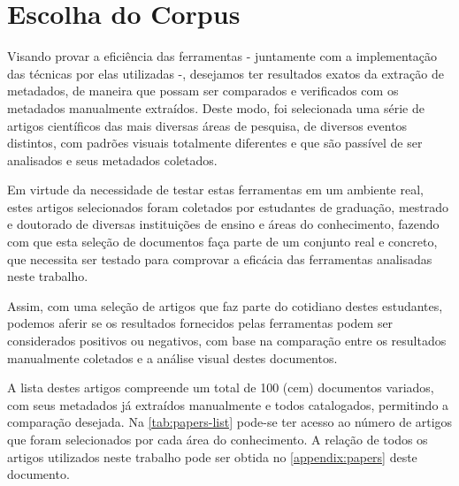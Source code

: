 \section{Escolha do Corpus}
\label{sec:corpus}


Visando provar a eficiência das ferramentas - juntamente com a implementação das técnicas por elas utilizadas -, desejamos ter resultados exatos da extração de metadados, de maneira que possam ser comparados e verificados com os metadados manualmente extraídos. Deste modo, foi selecionada uma série de artigos científicos das mais diversas áreas de pesquisa, de diversos eventos distintos, com padrões visuais totalmente diferentes e que são passível de ser analisados e seus metadados coletados.


Em virtude da necessidade de testar estas ferramentas em um ambiente real, estes artigos selecionados foram coletados por estudantes de graduação, mestrado e doutorado de diversas instituições de ensino e áreas do conhecimento, fazendo com que esta seleção de documentos faça parte de um conjunto real e concreto, que necessita ser testado para comprovar a eficácia das ferramentas analisadas neste trabalho.

Assim, com uma seleção de artigos que faz parte do cotidiano destes estudantes, podemos aferir se os resultados fornecidos pelas ferramentas podem ser considerados positivos ou negativos, com base na comparação entre os resultados manualmente coletados e a análise visual destes documentos.


A lista destes artigos compreende um total de 100 (cem) documentos variados, com seus metadados já extraídos manualmente e todos catalogados, permitindo a comparação desejada. Na \autoref{tab:papers-list} pode-se ter acesso ao número de artigos que foram selecionados por cada área do conhecimento. A relação de todos os artigos utilizados neste trabalho pode ser obtida no \autoref{appendix:papers} deste documento.

